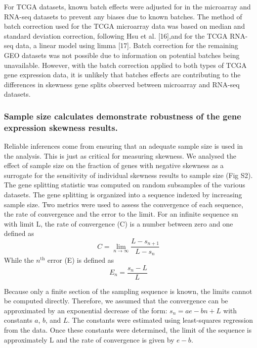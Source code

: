 \documentclass[11pt]{article}
\newcommand{\rd}[1]{{\color{red}#1}}
\begin{document}
\rd{For TCGA datasets, known batch effects were adjusted for in the microarray and RNA-seq datasets to prevent any biases due to known batches. The method of batch correction used for the TCGA microarray data was based on median and standard deviation correction, following Hsu et al. [16],and for the TCGA RNA-seq data, a linear model using limma [17]. Batch correction for the remaining GEO datasets was not possible due to information on potential batches being unavailable. However, with the batch correction applied to both types of TCGA gene expression data, it is unlikely that batches effects are contributing to the differences in skewness gene splits observed between microarray and RNA-seq datasets.  }

\subsubsection*{Sample size calculates demonstrate robustness of the gene expression skewness results.}

Reliable inferences come from ensuring that an adequate sample size is used in the analysis. This is just as critical for measuring skewness. We analysed the effect of sample size on the fraction of genes with negative skewness as a surrogate for the sensitivity of individual skewness results to sample size (Fig S2). The gene splitting statistic was computed on random subsamples of the various datasets. The gene splitting is organized into a sequence indexed by increasing sample size. Two metrics were used to assess the convergence of each sequence, the rate of convergence and the error to the limit. For an infinite sequence sn with limit L, the rate of convergence (C) is a number between zero and one defined as
\begin{equation}
 C = \lim_{n \to \infty} \frac{L - s_{n+1}}{L - s_n}
\end{equation}
While the $n^{\text{th}}$ error (E) is defined as
\begin{equation}
E_n = \frac{s_n - L}{L} 
\end{equation}

Because only a finite section of the sampling sequence is known, the limits cannot be computed directly. Therefore, we assumed that the convergence can be approximated by an exponential decrease of the form: $s_n = ae - bn + L$ with constants $a$, $b$, and $L$. The constants were estimated using least-squares regression from the data. Once these constants were determined, the limit of the sequence is approximately L and the rate of convergence is given by $e - b$.
\newline
\end{document}
